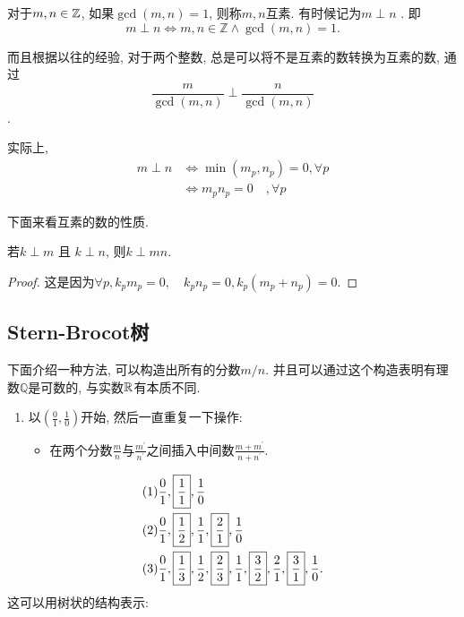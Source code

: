 \documentclass{ctexart}
\begin{document}
\begin{definition} 对于$m, n\in {\mathbb Z}$, 如果$\gcd(m,n)=1$, 则称$m, n$互素. 有时候记为$m \perp n$
.    
即$$m \perp n \Leftrightarrow m, n \in \mathbb{Z} \wedge \operatorname{gcd}(m, n)=1.$$
\end{definition}

而且根据以往的经验, 对于两个整数, 总是可以将不是互素的数转换为互素的数, 通过$$\frac{m}{\operatorname{gcd}(m, n)} \perp \frac{n}{\operatorname{gcd}(m, n)}$$.

实际上, $$\begin{aligned} m \perp n & \Leftrightarrow \min \left(m_p, n_p\right)=0, \forall p \\ & \Leftrightarrow m_p n_p=0 \quad, \forall p\end{aligned}$$

下面来看互素的数的性质. 

\begin{prop} 若$k \perp m$ 且 $k \perp n$, 则$k \perp mn$. 
    
\end{prop}

\begin{proof}
    这是因为$\forall p, k_p m_p=0, \quad k_p n_p=0, k_p\left(m_p+n_p\right)=0$.
\end{proof}

\subsection{Stern-Brocot树} 下面介绍一种方法, 可以构造出所有的分数$m/n$. 并且可以通过这个构造表明有理数$\mathbb Q$是可数的, 与实数$\mathbb R$有本质不同.  

\begin{enumerate}
    \item 以$\left(\frac{0}{1}, \frac{1}{0}\right)$开始, 然后一直重复一下操作:
        \begin{itemize}
            \item 在两个分数$\frac{m}{n} $与$ \frac{m^{\prime}}{n^{\prime}}$之间插入中间数$\frac{m+m^{\prime}}{n+n^{\prime}}$. 
        \end{itemize}
\end{enumerate}

\begin{example}
    $$
    \begin{aligned}(1) & \frac{0}{1},\text{\fbox{\ensuremath{\frac{1}{1}}}},\frac{1}{0}\\
(2) & \frac{0}{1},\text{\fbox{\ensuremath{\frac{1}{2}}}},\frac{1}{1},\text{\fbox{\ensuremath{\frac{2}{1}}}},\frac{1}{0}\\
(3) & \frac{0}{1},\text{\fbox{\ensuremath{\frac{1}{3}}}},\frac{1}{2},\text{\fbox{\ensuremath{\frac{2}{3}}}},\frac{1}{1},\text{\fbox{\ensuremath{\frac{3}{2}}}},\frac{2}{1},\text{\fbox{\ensuremath{\frac{3}{1}}}},\frac{1}{0}.
\end{aligned}
    $$
    这可以用树状的结构表示: 
\end{example}
\end{document}
